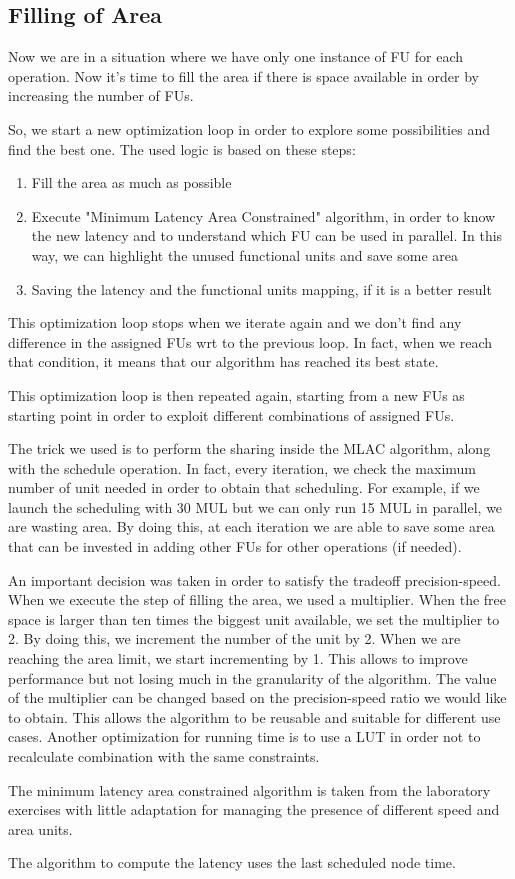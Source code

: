\documentclass{article}
\begin{document}
  \subsection{Filling of Area}

  Now we are in a situation where we have only one instance of FU for each operation. Now it's time to fill the area if there is space available in order by increasing the number of FUs.

  So, we start a new optimization loop in order to explore some possibilities and find the best one. The used logic is based on these steps:
  \begin{enumerate}
      \item Fill the area as much as possible
      \item Execute "Minimum Latency Area Constrained" algorithm, in order to know the new latency and to understand which FU can be used in parallel. In this way, we can highlight the unused functional units and save some area
      \item Saving the latency and the functional units mapping, if it is a better result
  \end{enumerate}

  This optimization loop stops when we iterate again and we don't find any difference in the assigned FUs wrt to the previous loop. In fact, when we reach that condition, it means that our algorithm has reached its best state. 

  This optimization loop is then repeated again, starting from a new FUs as starting point in order to exploit different combinations of assigned FUs.

  The trick we used is to perform the sharing inside the MLAC algorithm, along with the schedule operation. In fact, every iteration, we check the maximum number of unit needed in order to obtain that scheduling. For example, if we launch the scheduling with 30 MUL but we can only run 15 MUL in parallel, we are wasting area. By doing this, at each iteration we are able to save some area that can be invested in adding other FUs for other operations (if needed).

  An important decision was taken in order to satisfy the tradeoff precision-speed. When we execute the step of filling the area, we used a multiplier. When the free space is larger than ten times the biggest unit available, we set the multiplier to 2. By doing this, we increment the number of the unit by 2. When we are reaching the area limit, we start incrementing by 1. This allows to improve performance but not losing much in the granularity of the algorithm. The value of the multiplier can be changed based on the precision-speed ratio we would like to obtain. This allows the algorithm to be reusable and suitable for different use cases. 
  Another optimization for running time is to use a LUT in order not to recalculate combination with the same constraints. 

  The minimum latency area constrained algorithm is taken from the laboratory exercises with little adaptation for managing the presence of different speed and area units. 

  The algorithm to compute the latency uses the last scheduled node time. 

  
\end{document}
